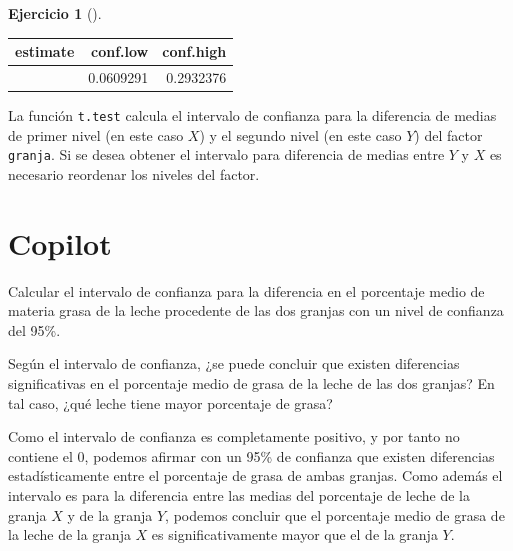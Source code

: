 \documentclass[
  a4paper,
]{scrreport}
\newenvironment{Shaded}{\begin{snugshade}}{\end{snugshade}}
\newcommand{\ExtensionTok}[1]{\textcolor[rgb]{0.00,0.23,0.31}{#1}}
\newcommand{\NormalTok}[1]{\textcolor[rgb]{0.00,0.23,0.31}{#1}}
\newcommand{\PreprocessorTok}[1]{\textcolor[rgb]{0.68,0.00,0.00}{#1}}
\theoremstyle{definition}
\newtheorem{exercise}{Ejercicio}[chapter]
\theoremstyle{remark}
\begin{document}
\begin{exercise}[]
\begin{enumerate}
\begin{tcolorbox}
  \begin{longtable}[]{@{}rrr@{}}
  \toprule\noalign{}
  estimate & conf.low & conf.high \\
  \midrule\noalign{}
  \endhead
  \bottomrule\noalign{}
  \endlastfoot
  0.1770833 & 0.0609291 & 0.2932376 \\
  \end{longtable}

  \begin{tcolorbox}[enhanced jigsaw, colframe=quarto-callout-warning-color-frame, toprule=.15mm, bottomtitle=1mm, breakable, opacitybacktitle=0.6, toptitle=1mm, colback=white, bottomrule=.15mm, title=\textcolor{quarto-callout-warning-color}{\faExclamationTriangle}\hspace{0.5em}{Advertencia}, arc=.35mm, left=2mm, titlerule=0mm, rightrule=.15mm, coltitle=black, leftrule=.75mm, opacityback=0, colbacktitle=quarto-callout-warning-color!10!white]

  La función \texttt{t.test} calcula el intervalo de confianza para la
  diferencia de medias de primer nivel (en este caso \(X\)) y el segundo
  nivel (en este caso \(Y\)) del factor \texttt{granja}. Si se desea
  obtener el intervalo para diferencia de medias entre \(Y\) y \(X\) es
  necesario reordenar los niveles del factor.

  \end{tcolorbox}

  \section{Copilot}

\begin{Shaded}
\begin{Highlighting}[]
\ExtensionTok{Calcular}\NormalTok{ el intervalo de confianza para la diferencia en el porcentaje medio de materia grasa de la leche procedente de las dos granjas con un nivel de confianza del 95\%.}

\ExtensionTok{Según}\NormalTok{ el intervalo de confianza, ¿se puede concluir que existen diferencias significativas en el porcentaje medio de grasa de la leche de las dos granjas}\PreprocessorTok{?}\NormalTok{ En tal caso, ¿qué leche tiene mayor porcentaje de grasa}\PreprocessorTok{?}
\end{Highlighting}
\end{Shaded}

  Como el intervalo de confianza es completamente positivo, y por tanto
  no contiene el 0, podemos afirmar con un 95\% de confianza que existen
  diferencias estadísticamente entre el porcentaje de grasa de ambas
  granjas. Como además el intervalo es para la diferencia entre las
  medias del porcentaje de leche de la granja \(X\) y de la granja
  \(Y\), podemos concluir que el porcentaje medio de grasa de la leche
  de la granja \(X\) es significativamente mayor que el de la granja
  \(Y\).

  \end{tcolorbox}
\end{enumerate}

\end{exercise}
\end{document}
